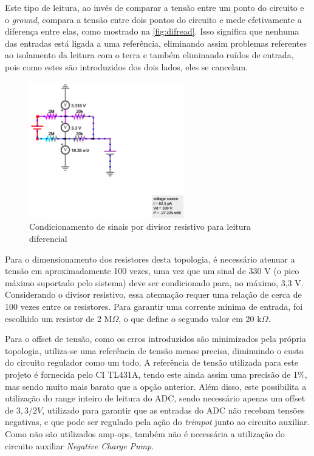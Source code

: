 Este tipo de leitura, ao invés de comparar a tensão entre um ponto do circuito e o \textit{ground}, compara a tensão entre dois pontos do circuito e mede efetivamente a diferença entre elas, como mostrado na \autoref{fig:difread}. Isso significa que nenhuma das entradas está ligada a uma referência, eliminando assim problemas referentes ao isolamento da leitura com o terra e também eliminando ruídos de entrada, pois como estes são introduzidos dos dois lados, eles se cancelam.

\begin{figure}[htb!]
    \caption{Condicionamento de sinais por divisor resistivo para leitura diferencial}
    \label{fig:difread}
    \includegraphics[width=0.6\textwidth]{figuras/difread.png}
    \fonte{}
\end{figure}

Para o dimensionamento dos resistores desta topologia, é necessário atenuar a tensão em aproximadamente 100 vezes, uma vez que um sinal de 330 V (o pico máximo suportado pelo sistema) deve ser condicionado para, no máximo, 3,3 V. Considerando o divisor resistivo, essa atenuação requer uma relação de cerca de 100 vezes entre os resistores. Para garantir uma corrente mínima de entrada, foi escolhido um resistor de 2 M$\Omega$, o que define o segundo valor em 20 k$\Omega$.

Para o offset de tensão, como os erros introduzidos são minimizados pela própria topologia, utiliza-se uma referência de tensão menos precisa, diminuindo o custo do circuito regulador como um todo. A referência de tensão utilizada para este projeto é fornecida pelo \gls{CI} TL431A, tendo este ainda assim uma precisão de 1\%, mas sendo muito mais barato que a opção anterior. Além disso, este possibilita a utilização do range inteiro de leitura do \gls{ADC}, sendo necessário apenas um offset de $3,3/2 V$, utilizado para garantir que as entradas do ADC não recebam tensões negativas, e que pode ser regulado pela ação do \textit{trimpot} junto ao circuito auxiliar. Como não são utilizados \gls{amp-op}s, também não é necessária a utilização do circuito auxiliar \textit{Negative Charge Pump}.


